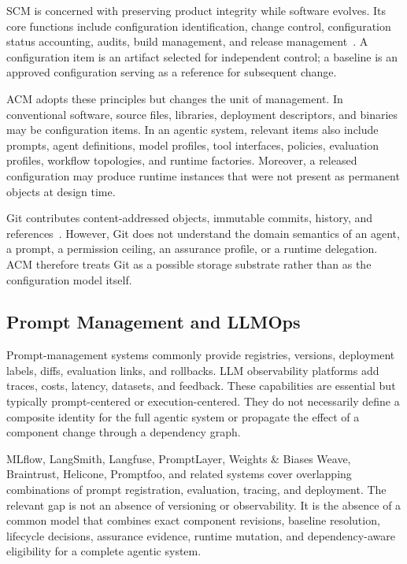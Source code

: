\documentclass[10pt]{article}
\begin{document}
SCM is concerned with preserving product integrity while software evolves. Its core functions include configuration identification, change control, configuration status accounting, audits, build management, and release management~\cite{ieee828,swebok2024}. A configuration item is an artifact selected for independent control; a baseline is an approved configuration serving as a reference for subsequent change.

ACM adopts these principles but changes the unit of management. In conventional software, source files, libraries, deployment descriptors, and binaries may be configuration items. In an agentic system, relevant items also include prompts, agent definitions, model profiles, tool interfaces, policies, evaluation profiles, workflow topologies, and runtime factories. Moreover, a released configuration may produce runtime instances that were not present as permanent objects at design time.

Git contributes content-addressed objects, immutable commits, history, and references~\cite{gitinternals}. However, Git does not understand the domain semantics of an agent, a prompt, a permission ceiling, an assurance profile, or a runtime delegation. ACM therefore treats Git as a possible storage substrate rather than as the configuration model itself.

\subsection{Prompt Management and LLMOps}

Prompt-management systems commonly provide registries, versions, deployment labels, diffs, evaluation links, and rollbacks. LLM observability platforms add traces, costs, latency, datasets, and feedback. These capabilities are essential but typically prompt-centered or execution-centered. They do not necessarily define a composite identity for the full agentic system or propagate the effect of a component change through a dependency graph.

MLflow, LangSmith, Langfuse, PromptLayer, Weights \& Biases Weave, Braintrust, Helicone, Promptfoo, and related systems cover overlapping combinations of prompt registration, evaluation, tracing, and deployment. The relevant gap is not an absence of versioning or observability. It is the absence of a common model that combines exact component revisions, baseline resolution, lifecycle decisions, assurance evidence, runtime mutation, and dependency-aware eligibility for a complete agentic system.
\end{document}
